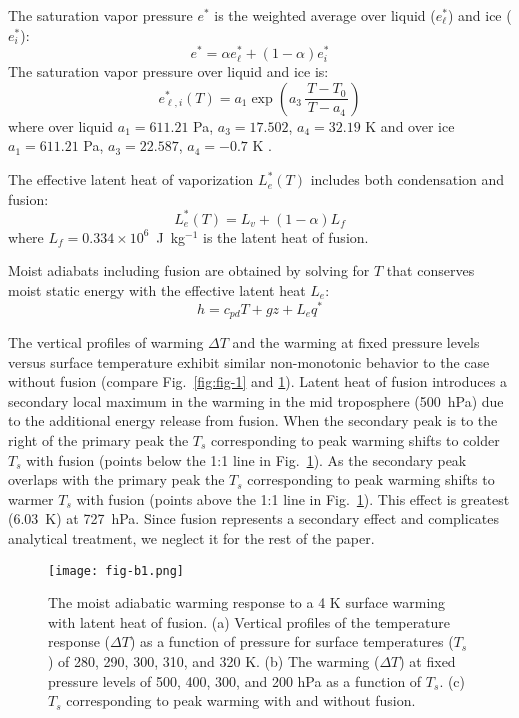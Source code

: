 \documentclass[draft]{ametsocV6.1}
\begin{document}
The saturation vapor pressure $e^*$ is the weighted average over liquid ($e_\ell^*$) and ice ($e_i^*$):
\begin{equation}
e^*=\alpha e_{\ell}^*+(1-\alpha)e_i^*
\end{equation}
The saturation vapor pressure over liquid and ice is:
\begin{equation}
e_{\ell,i}^*(T) = a_1 \exp \left( a_3 \,\frac{T - T_0}{\,T - a_4\,} \right)
\label{eq:es_general}
\end{equation}
where over liquid $a_1=611.21$ Pa, $a_3=17.502$, $a_4=32.19$ K \citep{buck1981} and over ice $a_1=611.21$ Pa, $a_3=22.587$, $a_4=-0.7$ K \citep{alduchov1996}.

The effective latent heat of vaporization $L_e^*(T)$ includes both condensation and fusion:
\begin{equation}
L_e^*(T) = L_v + (1-\alpha) L_f
\end{equation}
where $L_f = 0.334 \times 10^6$~J~kg$^{-1}$ is the latent heat of fusion.

Moist adiabats including fusion are obtained by solving for $T$ that conserves moist static energy with the effective latent heat $L_e$:
\begin{equation}
    h = c_{pd}T + gz + L_e q^*  \label{eq:mse_fusion}
\end{equation}

The vertical profiles of warming $\Delta T$ and the warming at fixed pressure levels versus surface temperature exhibit similar non-monotonic behavior to the case without fusion (compare Fig.~\ref{fig:fig-1} and \ref{fig:fig-b1}). Latent heat of fusion introduces a secondary local maximum in the warming in the mid troposphere (500~hPa) due to the additional energy release from fusion. When the secondary peak is to the right of the primary peak the $T_s$ corresponding to peak warming shifts to colder $T_s$ with fusion (points below the 1:1 line in Fig.~\ref{fig:fig-b1}). As the secondary peak overlaps with the primary peak the $T_s$ corresponding to peak warming shifts to warmer $T_s$ with fusion (points above the 1:1 line in Fig.~\ref{fig:fig-b1}). This effect is greatest (6.03~K) at 727~hPa. Since fusion represents a secondary effect and complicates analytical treatment, we neglect it for the rest of the paper.

\begin{figure}[htbp]
 \centering
 \texttt{[image: fig-b1.png]}
 \caption{The moist adiabatic warming response to a 4 K surface warming with latent heat of fusion. (a) Vertical profiles of the temperature response ($\Delta T$) as a function of pressure for surface temperatures ($T_s$) of 280, 290, 300, 310, and 320 K. (b) The warming ($\Delta T$) at fixed pressure levels of 500, 400, 300, and 200 hPa as a function of $T_s$. (c) $T_s$ corresponding to peak warming with and without fusion.}\label{fig:fig-b1}
\end{figure}
\end{document}
